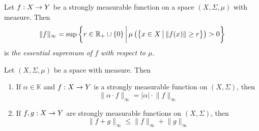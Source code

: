 \begin{definition}
Let $f:X\rightarrow Y$ be a strongly measurable function on a space $(X,\Sigma,\mu)$ with measure. Then 
$$\lVert f \rVert_{\infty} = \sup \bigg\{r\in {\mathbb R}_+\cup \{0\}\,\bigg|\,\mu\left(\big\{x\in X\,\big|\,\lVert f(x)\rVert \geq r\big\}\right) > 0\bigg\}$$
is \textit{the essential supremum of $f$ with respect to $\mu$}.
\end{definition}

\begin{proposition}\label{proposition:L_infinity_norm_is_seminorm}
Let $(X,\Sigma,\mu)$ be a space with measure. Then 
\begin{enumerate}[label=\emph{\textbf{(\arabic*)}}, leftmargin=*]
\item If $\alpha \in \mathbb{K}$ and $f:X\rightarrow Y$ is a strongly measurable function on $(X,\Sigma)$, then
$$\lVert \alpha \cdot f\rVert_{\infty} = |\alpha|\cdot \lVert f\rVert_{\infty}$$
\item If $f,g:X\rightarrow Y$ are strongly measurable functions on $(X,\Sigma)$, then
$$\lVert f + g \rVert_{\infty} \leq \lVert f \rVert_{\infty} + \lVert g \rVert_{\infty}$$
\end{enumerate}
\end{proposition}
